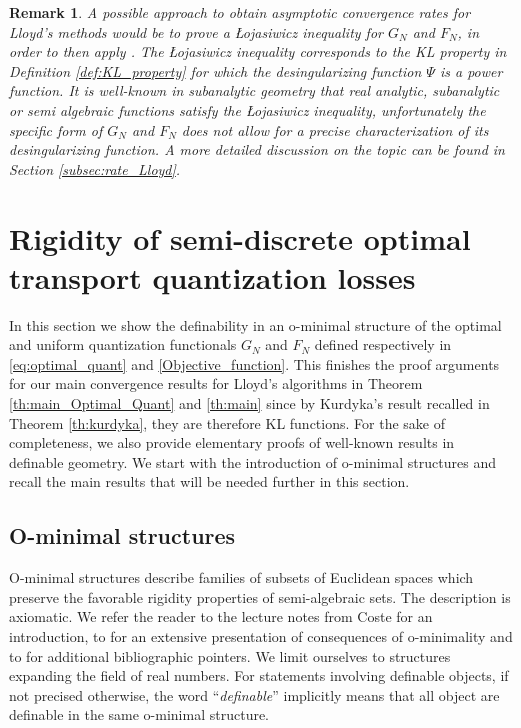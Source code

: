 \documentclass[11pt]{article}
\newcommand{\1}{\mathbbm{1}}
\newtheorem{rem}[lem]{Remark}
\numberwithin{equation}{section}
\begin{document}
\begin{rem}
	A possible approach to obtain asymptotic convergence rates for Lloyd's methods would be to prove a \L{}ojasiwicz inequality for $G_N$ and $F_N$, in order to then apply \cite[Theorem 11]{proximalbolte2010defKL}. The \L{}ojasiwicz inequality corresponds to the KL property in Definition \eqref{def:KL_property} for which the desingularizing function $\Psi$ is a power function. It is well-known in subanalytic geometry that real analytic, subanalytic or semi algebraic functions satisfy the \L{}ojasiwicz inequality, unfortunately the specific form of $G_N$ and $F_N$ does not allow for a precise characterization of its desingularizing function. A more detailed discussion on the topic can be found in Section \ref{subsec:rate_Lloyd}.
\end{rem}


\section{Rigidity of semi-discrete optimal transport quantization losses}
\label{section_rigidity_of_semi_discrete_losses}

In this section we show the definability in an o-minimal structure of the optimal and uniform quantization functionals  $G_{N}$ and $F_{N}$ defined respectively in \eqref{eq:optimal_quant} and \eqref{Objective_function}. This finishes the proof arguments for our main convergence results for Lloyd's algorithms in Theorem \ref{th:main_Optimal_Quant} and \ref{th:main} since by Kurdyka's result recalled in Theorem \ref{th:kurdyka}, they are therefore KL functions. 
For the sake of completeness, we also provide elementary proofs of well-known results in definable geometry. We start with the  introduction of o-minimal structures and recall the main results that will be needed further in this section.

\subsection{O-minimal structures}
\label{sec:oMin}
O-minimal structures describe families of subsets of Euclidean spaces which preserve the favorable rigidity properties of semi-algebraic sets. 
The description is axiomatic. We refer the reader to the lecture notes from Coste \cite{coste2000introduction} for an introduction, to \cite{driesmiller} for an extensive presentation of consequences of o-minimality and to \cite{loi2010lecture} for additional bibliographic pointers. We limit ourselves to structures expanding the field of real numbers.
For statements involving definable objects, if not precised otherwise, the word ``\emph{definable}'' implicitly means that all object are definable in the same o-minimal structure.
\end{document}
